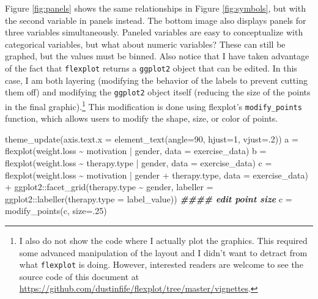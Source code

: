 \documentclass[
  english,
  man]{apa6}
\newenvironment{Shaded}{\begin{snugshade}}{\end{snugshade}}
\newcommand{\AttributeTok}[1]{\textcolor[rgb]{0.77,0.63,0.00}{#1}}
\newcommand{\DecValTok}[1]{\textcolor[rgb]{0.00,0.00,0.81}{#1}}
\newcommand{\DocumentationTok}[1]{\textcolor[rgb]{0.56,0.35,0.01}{\textbf{\textit{#1}}}}
\newcommand{\FunctionTok}[1]{\textcolor[rgb]{0.00,0.00,0.00}{#1}}
\newcommand{\NormalTok}[1]{#1}
\newcommand{\OtherTok}[1]{\textcolor[rgb]{0.56,0.35,0.01}{#1}}
\newcommand{\SpecialCharTok}[1]{\textcolor[rgb]{0.00,0.00,0.00}{#1}}
\begin{document}
Figure \ref{fig:panels} shows the same relationships in Figure \ref{fig:symbols}, but with the second variable in panels instead. The bottom image also displays panels for three variables simultaneously. Paneled variables are easy to conceptualize with categorical variables, but what about numeric variables? These can still be graphed, but the values must be binned. Also notice that I have taken advantage of the fact that \texttt{flexplot} returns a \texttt{ggplot2} object that can be edited. In this case, I am both layering (modifying the behavior of the labels to prevent cutting them off) and modifying the \texttt{ggplot2} object itself (reducing the size of the points in the final graphic).\footnote{I also do not show the code where I actually plot the graphics. This required some advanced manipulation of the layout and I didn't want to detract from what \texttt{flexplot} is doing. However, interested readers are welcome to see the source code of this document at \url{https://github.com/dustinfife/flexplot/tree/master/vignettes}.} This modification is done using flexplot's \texttt{modify\_points} function, which allows users to modify the shape, size, or color of points.

\small

\begin{Shaded}
\begin{Highlighting}[]
\FunctionTok{theme\_update}\NormalTok{(}\AttributeTok{axis.text.x =} \FunctionTok{element\_text}\NormalTok{(}\AttributeTok{angle=}\DecValTok{90}\NormalTok{, }\AttributeTok{hjust=}\DecValTok{1}\NormalTok{, }\AttributeTok{vjust=}\NormalTok{.}\DecValTok{2}\NormalTok{))}
\NormalTok{a }\OtherTok{=} \FunctionTok{flexplot}\NormalTok{(weight.loss }\SpecialCharTok{\textasciitilde{}}\NormalTok{ motivation }\SpecialCharTok{|}\NormalTok{ gender, }
             \AttributeTok{data =}\NormalTok{ exercise\_data) }
\NormalTok{b }\OtherTok{=} \FunctionTok{flexplot}\NormalTok{(weight.loss }\SpecialCharTok{\textasciitilde{}}\NormalTok{ therapy.type }\SpecialCharTok{|}\NormalTok{ gender, }
             \AttributeTok{data =}\NormalTok{ exercise\_data)}
\NormalTok{c }\OtherTok{=} \FunctionTok{flexplot}\NormalTok{(weight.loss }\SpecialCharTok{\textasciitilde{}}\NormalTok{ motivation }\SpecialCharTok{|}\NormalTok{  gender }\SpecialCharTok{+}\NormalTok{ therapy.type, }
             \AttributeTok{data =}\NormalTok{ exercise\_data) }\SpecialCharTok{+}
\NormalTok{      ggplot2}\SpecialCharTok{::}\FunctionTok{facet\_grid}\NormalTok{(therapy.type }\SpecialCharTok{\textasciitilde{}}\NormalTok{ gender, }
              \AttributeTok{labeller =}\NormalTok{ ggplot2}\SpecialCharTok{::}\FunctionTok{labeller}\NormalTok{(}\AttributeTok{therapy.type =}\NormalTok{ label\_value)) }
\DocumentationTok{\#\#\#\# edit point size}
\NormalTok{c }\OtherTok{=} \FunctionTok{modify\_points}\NormalTok{(c, }\AttributeTok{size=}\NormalTok{.}\DecValTok{25}\NormalTok{)}
\end{Highlighting}
\end{Shaded}
\end{document}
